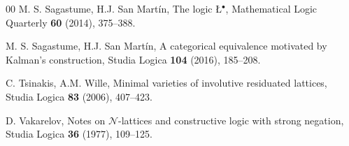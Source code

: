 \documentclass[final,12pt,times]{elsarticle}
\theoremstyle{plain}
\theoremstyle{definition}
\theoremstyle{break}
\begin{document}
\begin{thebibliography}{00}
 M. S. Sagastume, H.J. San Martín, The logic {\L}$^\bullet$, Mathematical Logic Quarterly \textbf{60} (2014), 375--388.

 M. S. Sagastume, H.J. San Martín, A categorical equivalence motivated by Kalman's construction, Studia Logica \textbf{104} (2016), 185--208.

 C. Tsinakis, A.M. Wille, Minimal varieties of involutive residuated lattices, Studia Logica \textbf{83} (2006), 407--423.

 D. Vakarelov, Notes on $\mathcal{N}$-lattices and constructive logic with strong negation, Studia Logica \textbf{36} (1977), 109--125.

\end{thebibliography}
\end{document}
